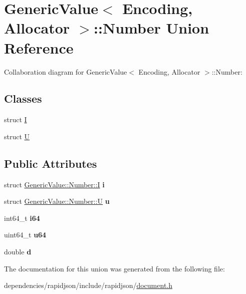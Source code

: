 \hypertarget{union_generic_value_1_1_number}{}\section{Generic\+Value$<$ Encoding, Allocator $>$\+:\+:Number Union Reference}
\label{union_generic_value_1_1_number}


Collaboration diagram for Generic\+Value$<$ Encoding, Allocator $>$\+:\+:Number\+:
\subsection*{Classes}
\begin{DoxyCompactItemize}
\item 
struct \hyperlink{struct_generic_value_1_1_number_1_1_i}{I}
\item 
struct \hyperlink{struct_generic_value_1_1_number_1_1_u}{U}
\end{DoxyCompactItemize}
\subsection*{Public Attributes}
\begin{DoxyCompactItemize}
\item 
\mbox{\label{union_generic_value_1_1_number_a0593fffc72a240979606668179e94436}} 
struct \hyperlink{struct_generic_value_1_1_number_1_1_i}{Generic\+Value\+::\+Number\+::I} {\bfseries i}
\item 
\mbox{\label{union_generic_value_1_1_number_a3b5f0986718c830b88d641491248131d}} 
struct \hyperlink{struct_generic_value_1_1_number_1_1_u}{Generic\+Value\+::\+Number\+::U} {\bfseries u}
\item 
\mbox{\label{union_generic_value_1_1_number_ae53d96a8ead92099541da3b71633b77b}} 
int64\+\_\+t {\bfseries i64}
\item 
\mbox{\label{union_generic_value_1_1_number_a1c8d3c6d226cf74315e233b30b622430}} 
uint64\+\_\+t {\bfseries u64}
\item 
\mbox{\label{union_generic_value_1_1_number_a7ca3ad492fff303586d241eb0d17c242}} 
double {\bfseries d}
\end{DoxyCompactItemize}


The documentation for this union was generated from the following file\+:\begin{DoxyCompactItemize}
\item 
dependencies/rapidjson/include/rapidjson/\hyperlink{document_8h}{document.\+h}\end{DoxyCompactItemize}
